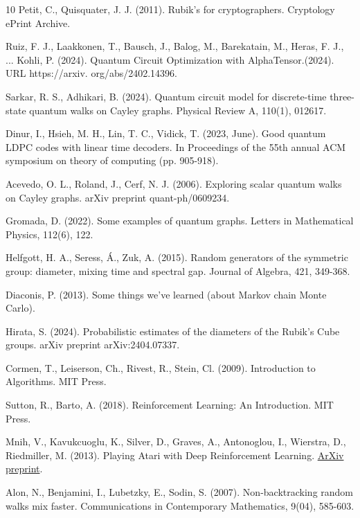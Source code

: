 \documentclass[reqno,11pt]{amsart}
\begin{document}
\begin{thebibliography}{10}
Petit, C., Quisquater, J. J. (2011). Rubik's for cryptographers. Cryptology ePrint Archive.

Ruiz, F. J., Laakkonen, T., Bausch, J., Balog, M., Barekatain, M., Heras, F. J., ...  Kohli, P. (2024). Quantum Circuit Optimization with AlphaTensor.(2024). URL https://arxiv. org/abs/2402.14396.

Sarkar, R. S.,  Adhikari, B. (2024). Quantum circuit model for discrete-time three-state quantum walks on Cayley graphs. Physical Review A, 110(1), 012617.


Dinur, I., Hsieh, M. H., Lin, T. C.,  Vidick, T. (2023, June). Good quantum LDPC codes with linear time decoders. In Proceedings of the 55th annual ACM symposium on theory of computing (pp. 905-918).

Acevedo, O. L., Roland, J.,  Cerf, N. J. (2006). Exploring scalar quantum walks on Cayley graphs. arXiv preprint quant-ph/0609234.

Gromada, D. (2022). Some examples of quantum graphs. Letters in Mathematical Physics, 112(6), 122.

Helfgott, H. A., Seress, Á.,  Zuk, A. (2015). Random generators of the symmetric group: diameter, mixing time and spectral gap. Journal of Algebra, 421, 349-368.


Diaconis, P. (2013). Some things we’ve learned (about Markov chain Monte Carlo).

Hirata, S. (2024). Probabilistic estimates of the diameters of the Rubik's Cube groups. arXiv preprint arXiv:2404.07337.

 Cormen, T., Leiserson, Ch., Rivest, R., Stein, Cl. (2009). Introduction to Algorithms. MIT Press.

 Sutton, R., Barto, A. (2018). Reinforcement Learning: An Introduction. MIT Press.

 Mnih, V., Kavukcuoglu, K., Silver, D., Graves, A., Antonoglou, I., Wierstra, D., Riedmiller, M. (2013). Playing Atari with Deep Reinforcement Learning. \href{https://arxiv.org/abs/1312.5602}{ArXiv preprint}.

Alon, N., Benjamini, I., Lubetzky, E.,  Sodin, S. (2007). Non-backtracking random walks mix faster. Communications in Contemporary Mathematics, 9(04), 585-603.


\end{thebibliography}
\end{document}
